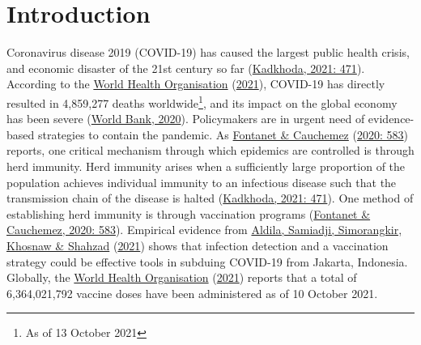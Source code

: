 \documentclass[11pt,preprint, authoryear]{elsarticle}
\numberwithin{equation}{section}
\numberwithin{figure}{section}
\numberwithin{table}{section}
\let\rmarkdownfootnote\footnote%
\def\footnote{\protect\rmarkdownfootnote}
\begin{document}
\renewcommand{\contentsname}{Table of Contents}
{\tableofcontents}

\pagestyle{fancy}
\chead{}
\rhead{}
\lfoot{}
\lhead{}
\cfoot{}


\headsep 35pt %




\newpage

\hypertarget{introduction}{%
\section{\texorpdfstring{Introduction
\label{Introduction}}{Introduction }}\label{introduction}}

Coronavirus disease 2019 (COVID-19) has caused the largest public health
crisis, and economic disaster of the 21st century so far
(\protect\hyperlink{ref-bad}{Kadkhoda, 2021: 471}). According to the
\protect\hyperlink{ref-who}{World Health Organisation}
(\protect\hyperlink{ref-who}{2021}), COVID-19 has directly resulted in
4,859,277 deaths worldwide\footnote{As of 13 October 2021}, and its
impact on the global economy has been severe
(\protect\hyperlink{ref-bank}{World Bank, 2020}). Policymakers are in
urgent need of evidence-based strategies to contain the pandemic. As
\protect\hyperlink{ref-immun}{Fontanet \& Cauchemez}
(\protect\hyperlink{ref-immun}{2020: 583}) reports, one critical
mechanism through which epidemics are controlled is through herd
immunity. Herd immunity arises when a sufficiently large proportion of
the population achieves individual immunity to an infectious disease
such that the transmission chain of the disease is halted
(\protect\hyperlink{ref-bad}{Kadkhoda, 2021: 471}). One method of
establishing herd immunity is through vaccination programs
(\protect\hyperlink{ref-immun}{Fontanet \& Cauchemez, 2020: 583}).
Empirical evidence from \protect\hyperlink{ref-erad}{Aldila, Samiadji,
Simorangkir, Khosnaw \& Shahzad} (\protect\hyperlink{ref-erad}{2021})
shows that infection detection and a vaccination strategy could be
effective tools in subduing COVID-19 from Jakarta, Indonesia. Globally,
the \protect\hyperlink{ref-who}{World Health Organisation}
(\protect\hyperlink{ref-who}{2021}) reports that a total of
6,364,021,792 vaccine doses have been administered as of 10 October
2021.
\end{document}
